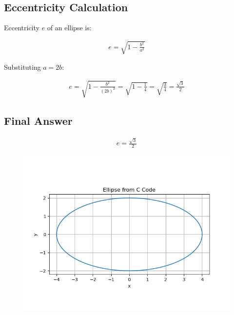 \documentclass{article}
\begin{document}
\subsection*{Eccentricity Calculation}

Eccentricity $e$ of an ellipse is:


\begin{align}
e = \sqrt{1 - \frac{b^2}{a^2}}
\end{align}

Substituting $a = 2b$:

\begin{align}
e = \sqrt{1 - \frac{b^2}{(2b)^2}} = \sqrt{1 - \frac{1}{4}} = \sqrt{\frac{3}{4}} = \frac{\sqrt{3}}{2}
\end{align}



\subsection*{Final Answer}



\begin{align}
\boxed{e = \frac{\sqrt{3}}{2}}
\end{align}


\begin{figure}[H]
    \centering
    \includegraphics[width=0.7\linewidth]{./figs/Figure_1.png}
    \caption{}
    \label{fig:fig1}
\end{figure}
\end{document}
